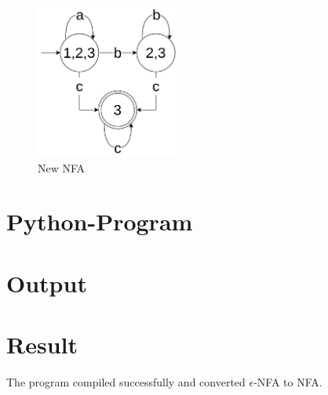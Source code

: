 \begin{figure}[H]
	\centering
	\includegraphics[height=2in]{../EXP5/diagram-ans.png}
	\caption{New NFA}
\end{figure}

\section{Python-Program}


\section{Output}


\section{Result}
The program compiled successfully and converted $\epsilon$-NFA to NFA.